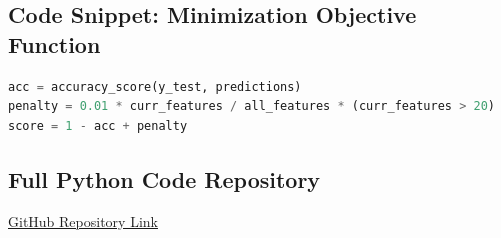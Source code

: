 \documentclass[12pt]{article}
\begin{document}
\subsection*{Code Snippet: Minimization Objective Function}
\begin{lstlisting}[language=Python, basicstyle=\ttfamily\small]
acc = accuracy_score(y_test, predictions)
penalty = 0.01 * curr_features / all_features * (curr_features > 20)
score = 1 - acc + penalty
\end{lstlisting}

\subsection*{Full Python Code Repository}
\href{https://github.com/ENSIA-AI/NMO-Alpha-PSO}{GitHub Repository Link}

\newpage


\end{document}
